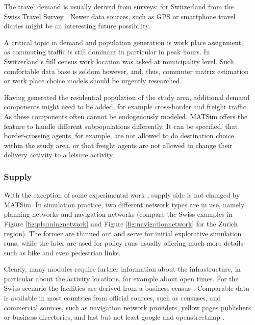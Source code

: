 The travel demand is usually derived from surveys; for Switzerland from the Swiss Travel Survey \citep[][]{BfS-MZ2005_manual_2006}. Newer data sources, such as GPS or smartphone travel diaries might be an interesting future possibility.

A critical topic in demand and population generation is work place assignment, as commuting traffic is still dominant in particular in peak hours. In Switzerland's full census work location was asked at municipality level. Such comfortable data base is seldom however, and, thus, commuter matrix estimation or work place choice models should be urgently researched.

Having generated the residential population of the study area, additional demand components might need to be added, for example cross-border and freight traffic. As these components often cannot be endogenously modeled, MATSim offers the feature to handle different subpopulations differently. It can be specified, that border-crossing agents, for example, are not allowed to do destination choice within the study area, or that freight agents are not allowed to change their delivery activity to a leisure activity.

\subsubsection{Supply}
With the exception of some experimental work \citep[][]{HorniEtAl_TechRep_IVT_2012}, supply side is not changed by MATSim. In simulation practice, two different network types are in use, namely planning networks and navigation networks (compare the Swiss examples in Figure \ref{fig:planningnetwork} and Figure \ref{fig:navigationnetwork} for the Zurich region). The former are thinned out and serve for initial explorative simulation runs, while the later are used for policy runs usually offering much more details such as bike and even pedestrian links.

Clearly, many modules require further information about the infrastructure, in particular about the activity locations, for example about open times. For the Swiss scenario the facilities are derived from a business census \citep[][]{}. Comparable data is available in most countries from official sources, such as censuses, and commercial sources, such as navigation network providers, yellow pages publishers or business directories, and last but not least google and openstreetmap \citep[][]{OpenStreetMap_Webpage_2015}.

